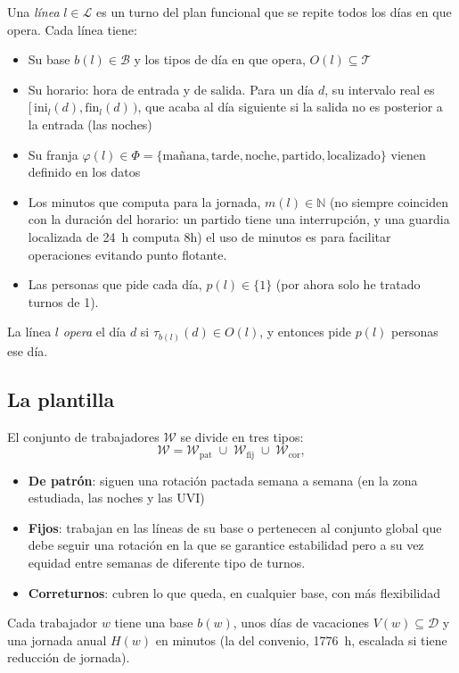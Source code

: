 \documentclass[11pt,a4paper]{article}
\newcommand{\Dias}{\mathcal{D}}
\newcommand{\Bases}{\mathcal{B}}
\newcommand{\Lin}{\mathcal{L}}
\newcommand{\Trab}{\mathcal{W}}
\newcommand{\Tipos}{\mathcal{T}}
\newcommand{\Franjas}{\Phi}
\begin{document}
Una \emph{línea} $l \in \Lin$ es un turno del plan funcional que se repite todos los días en que
opera. Cada línea tiene:
\begin{itemize}[nosep]
  \item Su base $b(l) \in \Bases$ y los tipos de día en que opera, $O(l) \subseteq \Tipos$
  \item Su horario: hora de entrada y de salida. Para un día $d$, su intervalo real es
        $[\,\mathrm{ini}_l(d), \mathrm{fin}_l(d)\,)$, que acaba al día siguiente si la salida
        no es posterior a la entrada (las noches)
  \item Su franja $\varphi(l) \in \Franjas = \{\text{mañana}, \text{tarde}, \text{noche},
        \text{partido}, \text{localizado}\}$ vienen definido en los datos
  \item Los minutos que computa para la jornada, $m(l) \in \mathbb{N}$ (no siempre coinciden con
        la duración del horario: un partido tiene una interrupción, y una guardia localizada de
        24~h computa 8h) el uso de minutos es para facilitar operaciones evitando punto flotante.
  \item Las personas que pide cada día, $p(l) \in \{1\}$ (por ahora solo he tratado turnos de 1).
\end{itemize}
La línea $l$ \emph{opera} el día $d$ si $\tau_{b(l)}(d) \in O(l)$, y entonces pide $p(l)$
personas ese día.

\subsection{La plantilla}

El conjunto de trabajadores $\Trab$ se divide en tres tipos:
\[
  \Trab = \Trab_{\mathrm{pat}} \;\cup\; \Trab_{\mathrm{fij}} \;\cup\; \Trab_{\mathrm{cor}},
\]
\begin{itemize}[nosep]
  \item \textbf{De patrón}: siguen una rotación pactada semana a semana (en la zona estudiada,
        las noches y las UVI)
  \item \textbf{Fijos}: trabajan en las líneas de su base o pertenecen al conjunto global que debe seguir una rotación en la que se garantice estabilidad pero a su vez equidad entre semanas de diferente tipo de turnos.
  \item \textbf{Correturnos}: cubren lo que queda, en cualquier base, con más flexibilidad
\end{itemize}
Cada trabajador $w$ tiene una base $b(w)$, unos días de vacaciones $V(w) \subseteq \Dias$ y una
jornada anual $H(w)$ en minutos (la del convenio, 1776~h, escalada si tiene reducción de
jornada).
\end{document}
